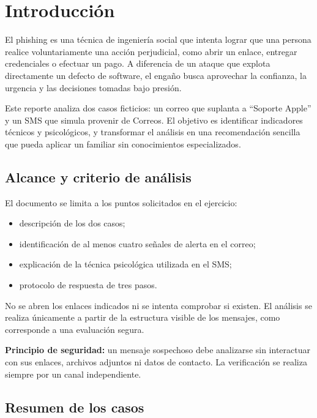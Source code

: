 \documentclass[11pt,a4paper]{article}
\newcommand{\infobox}[1]{%
  \noindent\colorbox{fondo}{\parbox{\dimexpr\textwidth-2\fboxsep}{#1}}}
\newcommand{\reportpage}{\clearpage\thispagestyle{fancy}}
\begin{document}
\reportpage
\section*{Introducción}

El phishing es una técnica de ingeniería social que intenta lograr que una persona realice voluntariamente una acción perjudicial, como abrir un enlace, entregar credenciales o efectuar un pago. A diferencia de un ataque que explota directamente un defecto de software, el engaño busca aprovechar la confianza, la urgencia y las decisiones tomadas bajo presión.

Este reporte analiza dos casos ficticios: un correo que suplanta a ``Soporte Apple'' y un SMS que simula provenir de Correos. El objetivo es identificar indicadores técnicos y psicológicos, y transformar el análisis en una recomendación sencilla que pueda aplicar un familiar sin conocimientos especializados.

\subsection*{Alcance y criterio de análisis}

El documento se limita a los puntos solicitados en el ejercicio:

\begin{itemize}
  \item descripción de los dos casos;
  \item identificación de al menos cuatro señales de alerta en el correo;
  \item explicación de la técnica psicológica utilizada en el SMS;
  \item protocolo de respuesta de tres pasos.
\end{itemize}

No se abren los enlaces indicados ni se intenta comprobar si existen. El análisis se realiza únicamente a partir de la estructura visible de los mensajes, como corresponde a una evaluación segura.

\infobox{\textcolor{azul}{\textbf{Principio de seguridad:}} un mensaje sospechoso debe analizarse sin interactuar con sus enlaces, archivos adjuntos ni datos de contacto. La verificación se realiza siempre por un canal independiente.}

\subsection*{Resumen de los casos}
\end{document}
